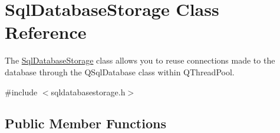 \hypertarget{class_sql_database_storage}{}\section{Sql\+Database\+Storage Class Reference}
\label{class_sql_database_storage}


The \hyperlink{class_sql_database_storage}{Sql\+Database\+Storage} class allows you to reuse connections made to the database through the Q\+Sql\+Database class within Q\+Thread\+Pool.  




{\ttfamily \#include $<$sqldatabasestorage.\+h$>$}

\subsection*{Public Member Functions}
